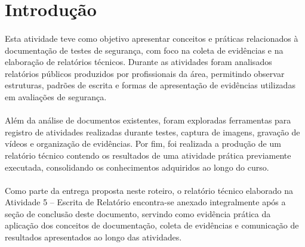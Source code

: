 \section{Introdução}

\paragraph{}
Esta atividade teve como objetivo apresentar conceitos e práticas relacionados
à documentação de testes de segurança, com foco na coleta de evidências e na
elaboração de relatórios técnicos. Durante as atividades foram analisados
relatórios públicos produzidos por profissionais da área, permitindo observar
estruturas, padrões de escrita e formas de apresentação de evidências
utilizadas em avaliações de segurança.

\paragraph{}
Além da análise de documentos existentes, foram exploradas ferramentas para
registro de atividades realizadas durante testes, captura de imagens, gravação
de vídeos e organização de evidências. Por fim, foi realizada a produção de um
relatório técnico contendo os resultados de uma atividade prática previamente
executada, consolidando os conhecimentos adquiridos ao longo do curso.

\paragraph{}
Como parte da entrega proposta neste roteiro, o relatório técnico elaborado na
Atividade 5 -- Escrita de Relatório encontra-se anexado integralmente após a
seção de conclusão deste documento, servindo como evidência prática da
aplicação dos conceitos de documentação, coleta de evidências e comunicação de
resultados apresentados ao longo das atividades.
